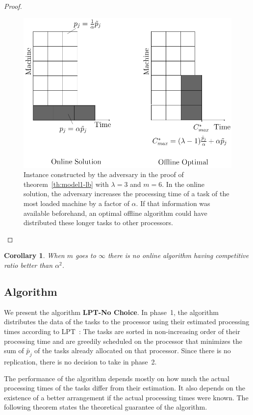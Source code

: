 \documentclass[10pt, conference, compsocconf]{IEEEtran}
\newtheorem{corollary}{Corollary}[theorem]
\begin{document}
\begin{proof}
  \begin{figure}[htp]
  \centering
  \includegraphics[width= 8 cm]{model1.pdf}
  \caption{Instance constructed by the adversary in the proof of
    theorem~\ref{th:model1-lb} with $\lambda = 3$ and $m = 6$. In the
    online solution, the adversary increases 
    the processing time of a task of the most loaded machine by a factor of $\alpha$. If
    that information was available beforehand, an optimal offline
    algorithm could have distributed these longer tasks to other
    processors.}
  \label{fig:rara}
  \end{figure}
\end{proof}    
  
  
  \begin{corollary}
  When $m$ goes to $\infty$ there is no online algorithm having competitive ratio better than $\alpha^{2}$.
  \end{corollary}
  
\subsection{Algorithm}

We present the algorithm \textbf{LPT-No Choice}. In phase~1, the
algorithm distributes the data of the tasks to the processor using
their estimated processing times according to 
LPT~\cite{Graham69boundson}: The tasks are sorted in non-increasing
order of their processing time and are greedily scheduled on the
processor that minimizes the sum of $\tilde{p_j}$ of the tasks
already allocated on that processor. Since there is no replication, there is
no decision to take in phase~2.

The performance of the algorithm depends mostly on how much the actual
processing times of the tasks differ from their estimation. It also depends on the
existence of a better arrangement if the actual processing times were
known. The following theorem states the theoretical guarantee of the
algorithm.
\end{document}
